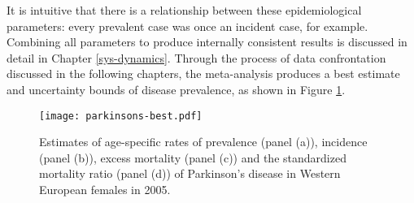 It is intuitive that there is a relationship between these
epidemiological parameters: every prevalent case was once an incident
case, for example.  Combining all parameters to produce internally
consistent results is discussed in detail in Chapter
\ref{sys-dynamics}.  Through the process of data confrontation
discussed in the following chapters, the meta-analysis produces a best
estimate and uncertainty bounds of disease prevalence, as shown in
Figure \ref{fig:intro-parkinsons fit}.

    \begin{figure}[h]
        \begin{center}
            \texttt{[image: parkinsons-best.pdf]}
            \caption{Estimates of age-specific rates of
              prevalence (panel (a)), incidence (panel (b)),
              excess mortality (panel (c)) and the
              standardized mortality ratio (panel (d)) of Parkinson's
              disease in Western European females in 2005.}
            \label{fig:intro-parkinsons fit}
        \end{center}
    \end{figure}
